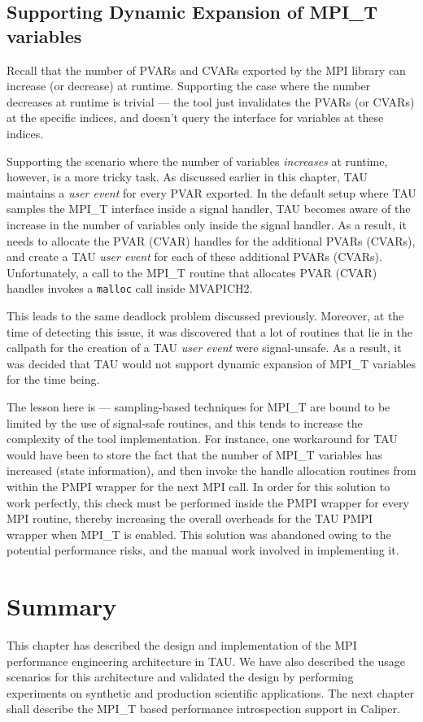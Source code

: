 \subsection {Supporting Dynamic Expansion of MPI\_T variables}
Recall that the number of PVARs and CVARs exported by the MPI library can increase (or decrease) at runtime. Supporting the case where the number decreases at runtime is trivial --- the tool just invalidates the PVARs (or CVARs) at the specific indices, and doesn't query the interface for variables at these indices.
\par Supporting the scenario where the number of variables \textit{increases} at runtime, however, is a more tricky task. As discussed earlier in this chapter, TAU maintains a \textit{user event} for every PVAR exported. In the default setup where TAU samples the MPI\_T interface inside a signal handler, TAU becomes aware of the increase in the number of variables only inside the signal handler. As a result, it needs to allocate the PVAR (CVAR) handles for the additional PVARs (CVARs), and create a TAU \textit{user event} for each of these additional PVARs (CVARs). Unfortunately, a call to the MPI\_T routine that allocates PVAR (CVAR) handles invokes a \verb+malloc+ call inside MVAPICH2. 
\par This leads to the same deadlock problem discussed previously. Moreover, at the time of detecting this issue, it was discovered that a lot of routines that lie in the callpath for the creation of a TAU \textit{user event} were signal-unsafe. As a result, it was decided that TAU would not support dynamic expansion of MPI\_T variables for the time being. 
\par The lesson here is --- sampling-based techniques for MPI\_T are bound to be limited by the use of signal-safe routines, and this tends to increase the complexity of the tool implementation. For instance, one workaround for TAU would have been to store the fact that the number of MPI\_T variables has increased (state information), and then invoke the handle allocation routines from within the PMPI wrapper for the next MPI call. In order for this solution to work perfectly, this check must be performed inside the PMPI wrapper for every MPI routine, thereby increasing the overall overheads for the TAU PMPI wrapper when MPI\_T is enabled. This solution was abandoned owing to the potential performance risks, and the manual work involved in implementing it.
\section{Summary}
This chapter has described the design and implementation of the MPI performance engineering architecture in TAU. We have also described the usage scenarios for this architecture and validated the design by performing experiments on synthetic and production scientific applications. The next chapter shall describe the MPI\_T based performance introspection support in Caliper. 

